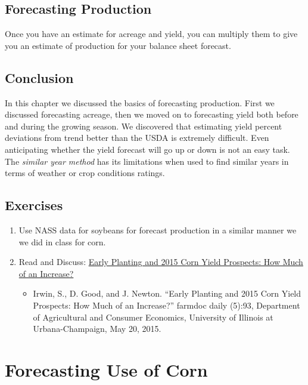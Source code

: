 \documentclass[]{book}
\providecommand{\tightlist}{%
  \setlength{\itemsep}{0pt}\setlength{\parskip}{0pt}}
\theoremstyle{definition}
\theoremstyle{definition}
\theoremstyle{remark}
\begin{document}
\section{Forecasting Production}\label{forecasting-production-1}

Once you have an estimate for acreage and yield, you can multiply them
to give you an estimate of production for your balance sheet forecast.

\section{Conclusion}\label{conclusion-1}

In this chapter we discussed the basics of forecasting production. First
we discussed forecasting acreage, then we moved on to forecasting yield
both before and during the growing season. We discovered that estimating
yield percent deviations from trend better than the USDA is extremely
difficult. Even anticipating whether the yield forecast will go up or
down is not an easy task. The \emph{similar year method} has its
limitations when used to find similar years in terms of weather or crop
conditions ratings.

\section{Exercises}\label{exercises-3}

\begin{enumerate}
\def\labelenumi{\arabic{enumi}.}
\item
  Use NASS data for soybeans for forecast production in a similar manner
  we we did in class for corn.
\item
  Read and Discuss:
  \href{http://farmdocdaily.illinois.edu/2015/05/early-planting-and-2015-corn-yield-prospects.html}{Early
  Planting and 2015 Corn Yield Prospects: How Much of an Increase?}

  \begin{itemize}
  \tightlist
  \item
    Irwin, S., D. Good, and J. Newton. ``Early Planting and 2015 Corn
    Yield Prospects: How Much of an Increase?'' farmdoc daily (5):93,
    Department of Agricultural and Consumer Economics, University of
    Illinois at Urbana-Champaign, May 20, 2015.
  \end{itemize}
\end{enumerate}

\chapter{Forecasting Use of Corn}\label{forecasting-use-of-corn}
\end{document}
